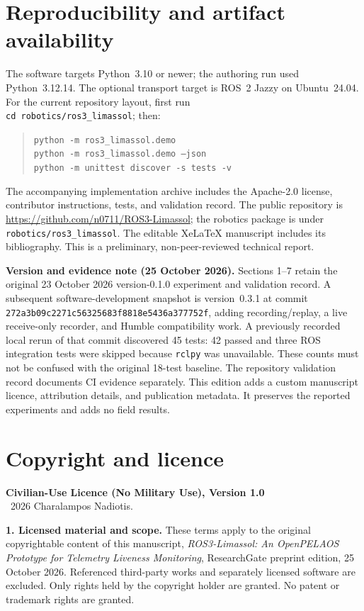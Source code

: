 \documentclass[11pt,a4paper]{article}
\newcommand{\code}[1]{\texttt{#1}}
\begin{document}
\section*{Reproducibility and artifact availability}
The software targets Python~3.10 or newer; the authoring run used Python~3.12.14.
The optional transport target is ROS~2 Jazzy on Ubuntu~24.04. For the current repository layout, first run\\
\code{cd robotics/ros3\_limassol}; then:
\begin{quote}\small
\code{python -m ros3\_limassol.demo}\\
\code{python -m ros3\_limassol.demo --json}\\
\code{python -m unittest discover -s tests -v}
\end{quote}
The accompanying implementation archive includes the Apache-2.0 license,
contributor instructions, tests, and validation record. The public repository is
\url{https://github.com/n0711/ROS3-Limassol}; the robotics package is under
\code{robotics/ros3\_limassol}. The editable XeLaTeX manuscript includes its
bibliography. This is a preliminary, non-peer-reviewed technical report.

\textbf{Version and evidence note (25 October 2026).}
Sections 1--7 retain the original 23 October 2026 version-0.1.0 experiment and
validation record. A subsequent software-development snapshot is version~0.3.1 at
commit \code{272a3b09c2271c56325683f8818e5436a377752f}, adding recording/replay,
a live receive-only recorder, and Humble compatibility work. A previously recorded local rerun of
that commit discovered 45 tests: 42 passed and three ROS integration tests were
skipped because \code{rclpy} was unavailable. These counts must not be confused
with the original 18-test baseline. The repository validation record documents
CI evidence separately. This edition adds a custom manuscript licence, attribution details, and
publication metadata. It preserves the reported experiments and adds no field results.

\clearpage
\section*{Copyright and licence}
\label{sec:licence}
\textbf{Civilian-Use Licence (No Military Use), Version 1.0}\\
\textcopyright\ 2026 Charalampos Nadiotis.

\textbf{1. Licensed material and scope.}
These terms apply to the original copyrightable content of this manuscript,
\emph{ROS3-Limassol: An OpenPELAOS Prototype for Telemetry Liveness Monitoring},
ResearchGate preprint edition, 25 October 2026. Referenced third-party works and
separately licensed software are excluded. Only rights held by the copyright
holder are granted. No patent or trademark rights are granted.
\end{document}
